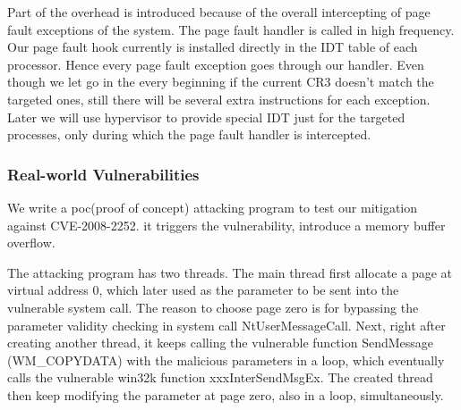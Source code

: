 Part of the overhead is introduced because of the overall intercepting of page fault exceptions of the system. The page fault handler is called in high frequency. Our page fault hook currently is installed directly in the IDT table of each processor. Hence every page fault exception goes through our handler. Even though we let go in the every beginning if the current CR3 doesn't match the targeted ones, still there will be several extra instructions for each exception. Later we will use hypervisor to provide special IDT just for the targeted processes, only during which the page fault handler is intercepted.


\subsubsection{Real-world Vulnerabilities}

We write a poc(proof of concept) attacking program to test our mitigation against CVE-2008-2252. it triggers the vulnerability, introduce a memory buffer overflow. 


The attacking program has two threads. The main thread first allocate a page at virtual address 0, which later used as the parameter to be sent into the vulnerable system call. The reason to choose page zero is for bypassing the parameter validity checking in system call NtUserMessageCall. Next, right after creating another thread, it keeps calling the vulnerable function SendMessage (WM_COPYDATA) with the malicious parameters in a loop, which eventually calls the vulnerable win32k function xxxInterSendMsgEx. The created thread then keep modifying the parameter at page zero, also in a loop, simultaneously.

